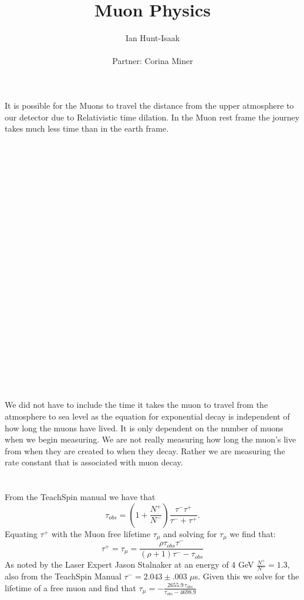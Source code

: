 \documentclass[11pt,letterpaper]{article}
\title{Muon Physics}
\author{Ian Hunt-Isaak\\ \begin{small}
Partner: Corina Miner
\end{small}}
\begin{document}
\date{}
\maketitle
\section{} %
It is possible for the Muons to travel the distance from the upper atmosphere to our detector due to Relativistic time dilation. In the Muon rest frame the journey takes much less time than in the earth frame. \\ \\ \\ \\ \\ \\\\ \\ \\ \\\\ \\ \\ \\\\ \\ \\ \\\\ \\ \\ \\


\section{} %
We did not have to include the time it takes the muon to travel from the atmosphere to sea level as the equation for exponential decay is independent of how long the muons have lived. It is only dependent on the number of muons when we begin measuring. We are not really measuring how long the muon's live from when they are created to when they decay. Rather we are measuring the rate constant that is associated with muon decay. 


\section{} %
From the TeachSpin manual we have that 
\begin{equation}
\label{eq:t_obs}
    \tau_{obs} = \left(1+\frac{N^+}{N^-}\right)\frac{\tau^-\tau^+}{\tau^-+\tau^+}.
\end{equation}
Equating $\tau^+$ with the Muon free lifetime $\tau_{\mu}$ and solving for $\tau_{\mu}$ we find that:
\begin{equation}
 \tau^+=\tau_{\mu} = \frac{\rho\tau_{\mathit{obs}} \tau^-}{{\left(\rho + 1\right)} \tau^ - -\tau_{\mathit{obs}}}
\end{equation}
As noted by the Laser Expert Jason Stalnaker at an energy of 4 GeV $\frac{N^+}{N^-}=1.3$, also from the TeachSpin Manual $\tau^-=2.043 \pm.003$ $\mu$s. Given this we solve for the lifetime of a free muon and find that $\tau_{\mu}= -\frac{2655.9 \, \tau_{\mathit{obs}}}{\tau_{\mathit{obs}} - 4698.9}$
\end{document}
